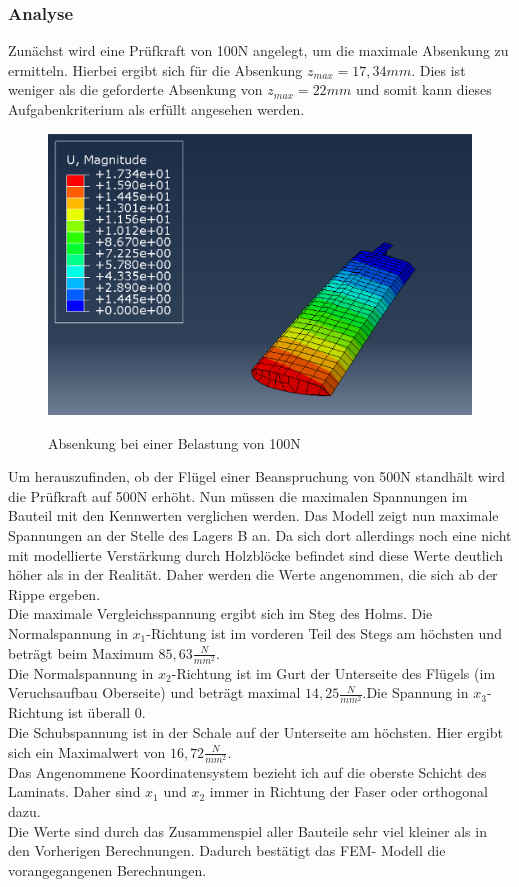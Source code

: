 \subsubsection{Analyse}
Zunächst wird eine Prüfkraft von 100N angelegt, um die maximale Absenkung zu ermitteln. Hierbei ergibt sich für die Absenkung $z_{max}=17,34mm$. Dies ist weniger als die geforderte Absenkung von $z_{max}=22mm$ und somit kann dieses Aufgabenkriterium als erfüllt angesehen werden.
\begin{figure}[h]
 \centering
 \includegraphics[scale=0.4]{Bilder/Absenkung_100N}\\
 \label{Absenkung}
 \caption{Absenkung bei einer Belastung von 100N}
\end{figure}
\newpage
Um herauszufinden, ob der Flügel einer Beanspruchung von 500N standhält wird die Prüfkraft auf 500N erhöht. Nun müssen die maximalen Spannungen im Bauteil mit den Kennwerten verglichen werden. Das Modell zeigt nun maximale Spannungen an der Stelle des Lagers B an. Da sich dort allerdings noch eine nicht mit modellierte Verstärkung durch Holzblöcke befindet sind diese Werte deutlich höher als in der Realität. Daher werden die Werte angenommen, die sich ab der Rippe ergeben.\\
 Die maximale Vergleichsspannung ergibt sich im Steg des Holms. Die Normalspannung in $x_{1}$-Richtung ist im vorderen Teil des Stegs am höchsten und beträgt beim Maximum $85,63\frac{N}{mm^2}$.\\
Die Normalspannung in $x_{2}$-Richtung ist im Gurt der Unterseite des Flügels (im Veruchsaufbau Oberseite) und beträgt maximal $14,25\frac{N}{mm^2}$.Die Spannung in $x_{3}$-Richtung ist überall 0.\\
Die Schubspannung ist in der Schale auf der Unterseite am höchsten. Hier ergibt sich ein Maximalwert von $16,72\frac{N}{mm^2}$.\\
Das Angenommene Koordinatensystem bezieht ich auf die oberste Schicht des Laminats. Daher sind $x_{1}$ und $x_{2}$ immer in Richtung der Faser oder orthogonal dazu.\\
Die Werte sind durch das Zusammenspiel aller Bauteile sehr viel kleiner als in den Vorherigen Berechnungen. Dadurch bestätigt das FEM- Modell die vorangegangenen Berechnungen.
\newpage
